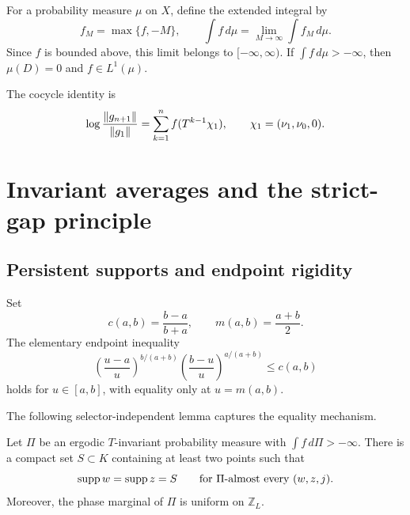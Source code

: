 \documentclass[letterpaper,twoside]{article}
\begin{document}
For a probability measure $\mu$ on $X$, define the extended integral by
\[
 f_M=\max\{f,-M\},
 \qquad
 \int f\,d\mu=\lim_{M\to\infty}\int f_M\,d\mu.
\]
Since $f$ is bounded above, this limit belongs to $[-\infty,\infty)$.  If
$\int f\,d\mu> -\infty$, then $\mu(D)=0$ and $f\in L^1(\mu)$.

The cocycle identity is
\begin{equation}\label{eq:cocycle}
 \log\frac{\lVert g_{n+1}\rVert}{\lVert g_1\rVert}
 =\sum_{k=1}^{n}f(T^{k-1}\chi_1),
 \qquad \chi_1=(\nu_1,\nu_0,0).
\end{equation}

\section{Invariant averages and the strict-gap principle}\label{sec:invariant}

\subsection{Persistent supports and endpoint rigidity}

Set
\begin{equation}\label{eq:cab}
 c(a,b)=\frac{b-a}{b+a},
 \qquad m(a,b)=\frac{a+b}{2}.
\end{equation}
The elementary endpoint inequality
\begin{equation}\label{eq:endpoint-inequality}
 \left(\frac{u-a}{u}\right)^{b/(a+b)}
 \left(\frac{b-u}{u}\right)^{a/(a+b)}
 \le c(a,b)
\end{equation}
holds for $u\in[a,b]$, with equality only at $u=m(a,b)$.

The following selector-independent lemma captures the equality mechanism.

\begin{lemma}\label{lem:persistent-support}
Let $\Pi$ be an ergodic $T$-invariant probability measure with
$\int f\,d\Pi> -\infty$.  There is a compact set $S\subset K$ containing at
least two points such that
\[
 \operatorname{supp} w=\operatorname{supp} z=S
 \qquad\text{for $\Pi$-almost every }(w,z,j).
\]
Moreover, the phase marginal of $\Pi$ is uniform on $\mathbb Z_L$.
\end{lemma}
\end{document}
